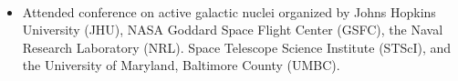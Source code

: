 \documentclass{article}
\begin{document}
\phantom \\
\begin{itemize}
\item Attended conference on active galactic nuclei organized by Johns Hopkins University (JHU),  NASA Goddard Space Flight Center (GSFC), the Naval Research Laboratory (NRL). Space Telescope Science Institute (STScI), and the University of Maryland, Baltimore County (UMBC).
\end{itemize}
\phantom \\
\phantom \\
%
%
%
%
%
%
\end{document}
